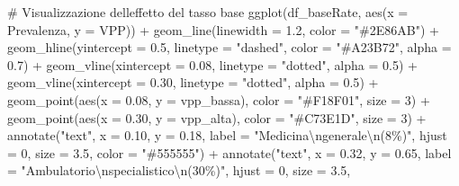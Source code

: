 \documentclass[
  letterpaper,
  DIV=11,
  numbers=noendperiod,
  oneside]{scrreprt}
\newenvironment{Shaded}{\begin{snugshade}}{\end{snugshade}}
\newcommand{\AttributeTok}[1]{\textcolor[rgb]{0.40,0.45,0.13}{#1}}
\newcommand{\CommentTok}[1]{\textcolor[rgb]{0.37,0.37,0.37}{#1}}
\newcommand{\DecValTok}[1]{\textcolor[rgb]{0.68,0.00,0.00}{#1}}
\newcommand{\FloatTok}[1]{\textcolor[rgb]{0.68,0.00,0.00}{#1}}
\newcommand{\FunctionTok}[1]{\textcolor[rgb]{0.28,0.35,0.67}{#1}}
\newcommand{\NormalTok}[1]{\textcolor[rgb]{0.00,0.23,0.31}{#1}}
\newcommand{\SpecialCharTok}[1]{\textcolor[rgb]{0.37,0.37,0.37}{#1}}
\newcommand{\StringTok}[1]{\textcolor[rgb]{0.13,0.47,0.30}{#1}}
\theoremstyle{definition}
\theoremstyle{plain}
\theoremstyle{definition}
\theoremstyle{remark}
\begin{document}
\begin{tcolorbox}
\begin{Shaded}
\begin{Highlighting}[]
\CommentTok{\# Visualizzazione dell\textquotesingle{}effetto del tasso base}
\FunctionTok{ggplot}\NormalTok{(df\_baseRate, }\FunctionTok{aes}\NormalTok{(}\AttributeTok{x =}\NormalTok{ Prevalenza, }\AttributeTok{y =}\NormalTok{ VPP)) }\SpecialCharTok{+}
  \FunctionTok{geom\_line}\NormalTok{(}\AttributeTok{linewidth =} \FloatTok{1.2}\NormalTok{, }\AttributeTok{color =} \StringTok{"\#2E86AB"}\NormalTok{) }\SpecialCharTok{+}
  \FunctionTok{geom\_hline}\NormalTok{(}\AttributeTok{yintercept =} \FloatTok{0.5}\NormalTok{, }\AttributeTok{linetype =} \StringTok{"dashed"}\NormalTok{, }\AttributeTok{color =} \StringTok{"\#A23B72"}\NormalTok{, }\AttributeTok{alpha =} \FloatTok{0.7}\NormalTok{) }\SpecialCharTok{+}
  \FunctionTok{geom\_vline}\NormalTok{(}\AttributeTok{xintercept =} \FloatTok{0.08}\NormalTok{, }\AttributeTok{linetype =} \StringTok{"dotted"}\NormalTok{, }\AttributeTok{alpha =} \FloatTok{0.5}\NormalTok{) }\SpecialCharTok{+}
  \FunctionTok{geom\_vline}\NormalTok{(}\AttributeTok{xintercept =} \FloatTok{0.30}\NormalTok{, }\AttributeTok{linetype =} \StringTok{"dotted"}\NormalTok{, }\AttributeTok{alpha =} \FloatTok{0.5}\NormalTok{) }\SpecialCharTok{+}
  \FunctionTok{geom\_point}\NormalTok{(}\FunctionTok{aes}\NormalTok{(}\AttributeTok{x =} \FloatTok{0.08}\NormalTok{, }\AttributeTok{y =}\NormalTok{ vpp\_bassa), }\AttributeTok{color =} \StringTok{"\#F18F01"}\NormalTok{, }\AttributeTok{size =} \DecValTok{3}\NormalTok{) }\SpecialCharTok{+}
  \FunctionTok{geom\_point}\NormalTok{(}\FunctionTok{aes}\NormalTok{(}\AttributeTok{x =} \FloatTok{0.30}\NormalTok{, }\AttributeTok{y =}\NormalTok{ vpp\_alta), }\AttributeTok{color =} \StringTok{"\#C73E1D"}\NormalTok{, }\AttributeTok{size =} \DecValTok{3}\NormalTok{) }\SpecialCharTok{+}
  \FunctionTok{annotate}\NormalTok{(}\StringTok{"text"}\NormalTok{, }\AttributeTok{x =} \FloatTok{0.10}\NormalTok{, }\AttributeTok{y =} \FloatTok{0.18}\NormalTok{, }
           \AttributeTok{label =} \StringTok{"Medicina}\SpecialCharTok{\textbackslash{}n}\StringTok{generale}\SpecialCharTok{\textbackslash{}n}\StringTok{(8\%)"}\NormalTok{, }\AttributeTok{hjust =} \DecValTok{0}\NormalTok{, }\AttributeTok{size =} \FloatTok{3.5}\NormalTok{, }
           \AttributeTok{color =} \StringTok{"\#555555"}\NormalTok{) }\SpecialCharTok{+}
  \FunctionTok{annotate}\NormalTok{(}\StringTok{"text"}\NormalTok{, }\AttributeTok{x =} \FloatTok{0.32}\NormalTok{, }\AttributeTok{y =} \FloatTok{0.65}\NormalTok{, }
           \AttributeTok{label =} \StringTok{"Ambulatorio}\SpecialCharTok{\textbackslash{}n}\StringTok{specialistico}\SpecialCharTok{\textbackslash{}n}\StringTok{(30\%)"}\NormalTok{, }\AttributeTok{hjust =} \DecValTok{0}\NormalTok{, }\AttributeTok{size =} \FloatTok{3.5}\NormalTok{,}

\end{Highlighting}
\end{Shaded}
\end{tcolorbox}
\end{document}
